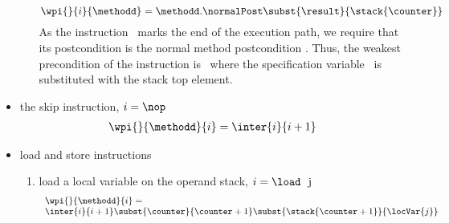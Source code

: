 \begin{itemize}
\begin{enumerate}
 $$\wpi{}{i}{\methodd}  = \methodd.\normalPost \subst{ \result }{\stack{\counter}}$$
 As the instruction \return \ marks the end of the execution path, we require that its postcondition is the normal method postcondition \normalPost.
 Thus, the weakest precondition of the instruction is \normalPost \ where the specification variable \result \  is substituted with the stack top
 element.

\end{enumerate}





\item the skip instruction, $i = \nop$ 
      $$ \begin{array}{l}
                          \wpi{}{ \methodd }{i} = 
			  \inter{i}{i+1}
                    \end{array} $$
 
\item  load and store instructions

	\begin{enumerate}
		\item load a local variable on the operand stack, $i = \load \  \mbox{ \rm j} $ \\
		 $$ \begin{array}{l}
                          \wpi{}{ \methodd }{i} =  \\
			  \inter{i}{i+1} \subst{\counter}{\counter +1}  \subst{  \stack{ \counter  + 1}}{\locVar{j}} 
					
                    \end{array} $$ 
                

\end{enumerate}
\end{itemize}
